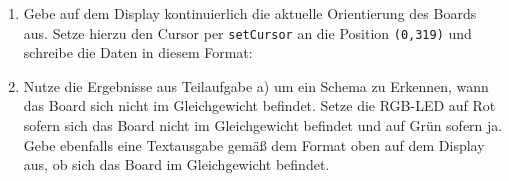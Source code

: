 \begin{enumerate}
	\item Gebe auf dem Display kontinuierlich die aktuelle Orientierung des Boards aus. Setze hierzu den Cursor per \lstinline|setCursor| an die Position \lstinline|(0,319)| und schreibe die Daten in diesem Format:
%	
%	
%
	\item Nutze die Ergebnisse aus Teilaufgabe a) um ein Schema zu Erkennen, wann das Board sich nicht im Gleichgewicht befindet. Setze die RGB-LED auf Rot sofern sich das Board nicht im Gleichgewicht befindet und auf Grün sofern ja. Gebe ebenfalls eine Textausgabe gemäß dem Format oben auf dem Display aus, ob sich das Board im Gleichgewicht befindet. 
\end{enumerate}

